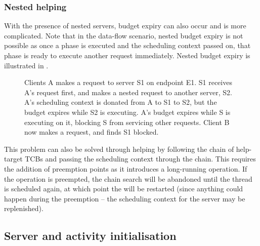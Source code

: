 \subsubsection{Nested helping}

With the presence of nested servers, budget expiry can also occur and is more complicated.
Note that in the data-flow scenario, nested budget expiry is not possible as once a phase is executed and the scheduling context passed on, that phase is ready to execute another request immediately.
Nested budget expiry is illustrated in .

\begin{figure}
\centering
\caption{Clients A makes a request to server S1 on endpoint E1. S1 receives A's request first, and makes a nested request to another server, S2. A's scheduling context is donated from A to S1 to S2, but the budget expires while S2 is executing.  A's budget expires while S is executing on it, blocking S from servicing other requests. Client B now makes a request, and finds S1 blocked.}
\label{fig:nested-budget-expiry}
\end{figure}

This problem can also be solved through helping by following the chain of help-target TCBs and passing the scheduling context through the chain.
This requires the addition of preemption points as it introduces a long-running operation.
If the operation is preempted, the chain search will be abandoned until the thread is scheduled again, at which point the \call will be restarted (since anything could happen during the preemption -- the scheduling context for the server may be replenished).

\subsection{Server and activity initialisation}

